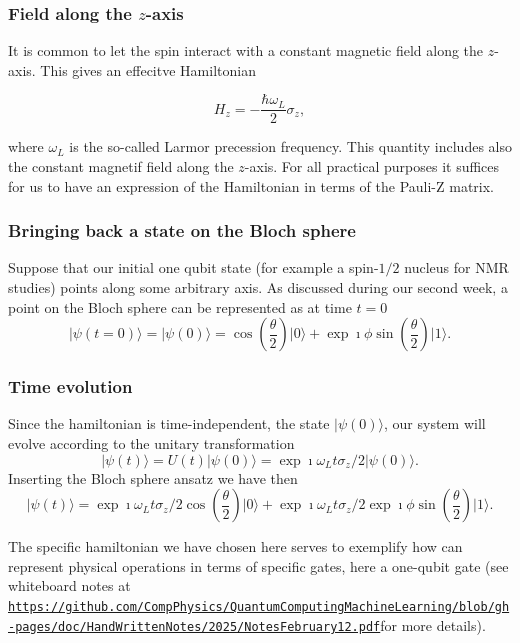 \documentclass{beamer}
\begin{document}
\begin{frame}
\frametitle{Field along the $z$-axis}

It is common to let the spin interact with a constant magnetic field
along the $z$-axis. This gives an effecitve Hamiltonian

\[
H_z = -\frac{\hbar\omega_L}{2}\sigma_z,
\]

where $\omega_L$ is the so-called Larmor precession frequency. This
quantity includes also the constant magnetif field along the
$z$-axis. For all practical purposes it suffices for us to have an
expression of the Hamiltonian in terms of the Pauli-Z matrix.
\end{frame}

\begin{frame}
\frametitle{Bringing back a state on the Bloch sphere}

Suppose that our initial one qubit state (for example a spin-$1/2$
nucleus for NMR studies) points along some arbitrary axis. As
discussed during our second week, a point on the Bloch sphere can be
represented as at time $t=0$
\[
\vert \psi(t=0) \rangle = \vert \psi(0) \rangle=\cos{(\frac{\theta}{2})}\vert 0\rangle +\exp{\imath\phi}\sin{(\frac{\theta}{2})}\vert 1\rangle.
\]
\end{frame}

\begin{frame}
\frametitle{Time evolution}

Since the hamiltonian is time-independent, the state $\vert \psi(0)
\rangle$, our system will evolve according to the unitary transformation 
\[
\vert \psi(t) \rangle = U(t)\vert \psi(0) \rangle=\exp{\imath\omega_L t\sigma_z/2}\vert \psi(0) \rangle.
\]
Inserting the Bloch sphere ansatz we have then
\[
\vert \psi(t) \rangle=\exp{\imath\omega_L t\sigma_z/2}\cos{(\frac{\theta}{2})}\vert 0\rangle +\exp{\imath\omega_L t\sigma_z/2}\exp{\imath\phi}\sin{(\frac{\theta}{2})}\vert 1\rangle.
\]

The specific hamiltonian we have chosen here serves to exemplify how can represent physical operations in terms of specific gates, here a one-qubit gate (see whiteboard notes at \href{{https://github.com/CompPhysics/QuantumComputingMachineLearning/blob/gh-pages/doc/HandWrittenNotes/2025/NotesFebruary12.pdf}}{\nolinkurl{https://github.com/CompPhysics/QuantumComputingMachineLearning/blob/gh-pages/doc/HandWrittenNotes/2025/NotesFebruary12.pdf}}for more details).
\end{frame}
\end{document}
